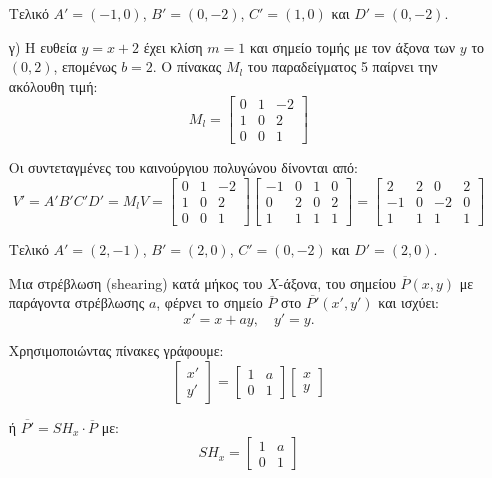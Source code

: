 \begin{solution}
\begin{enumerate}
Τελικό $A' = (-1, 0)$, $B' = (0, -2)$, $C' = (1, 0)$ και $D' = (0, -2)$.

    \item[γ)] Η ευθεία $y=x+2$ έχει κλίση $m=1$ και σημείο τομής με τον άξονα των $y$ το $(0,2)$, επομένως $b=2$. Ο πίνακας $M_l$ του παραδείγματος 5 παίρνει την ακόλουθη τιμή:
\[
M_l = \begin{bmatrix}
0 & 1 & -2 \\
1 & 0 & 2 \\
0 & 0 & 1
\end{bmatrix}
\]

Οι συντεταγμένες του καινούργιου πολυγώνου δίνονται από:
\[
V' = A'B'C'D' = M_l V = \begin{bmatrix}
0 & 1 & -2 \\
1 & 0 & 2 \\
0 & 0 & 1
\end{bmatrix}
\begin{bmatrix}
-1 & 0 & 1 & 0 \\
0 & 2 & 0 & 2 \\
1 & 1 & 1 & 1
\end{bmatrix} = \begin{bmatrix}
2 & 2 & 0 & 2 \\
-1 & 0 & -2 & 0 \\
1 & 1 & 1 & 1
\end{bmatrix}
\]

Τελικό $A' = (2, -1)$, $B' = (2, 0)$, $C' = (0, -2)$ και $D' = (2, 0)$.

Μια στρέβλωση (shearing) κατά μήκος του $X$-άξονα, του σημείου $\overline{P}(x, y)$ με παράγοντα στρέβλωσης $a$, φέρνει το σημείο $\overline{P}$ στο $\overline{P'}(x', y')$ και ισχύει:
\[
x' = x + ay, \quad y' = y .
\]

Χρησιμοποιώντας πίνακες γράφουμε:
\[
\begin{bmatrix}
x' \\
y'
\end{bmatrix} = \begin{bmatrix}
1 & a \\
0 & 1
\end{bmatrix}
\begin{bmatrix}
x \\
y
\end{bmatrix}
\]

ή \(\overline{P'} = SH_x \cdot \overline{P}\) με:
\[
SH_x = \begin{bmatrix}
1 & a \\
0 & 1
\end{bmatrix}
\]


\end{enumerate}
\end{solution}
